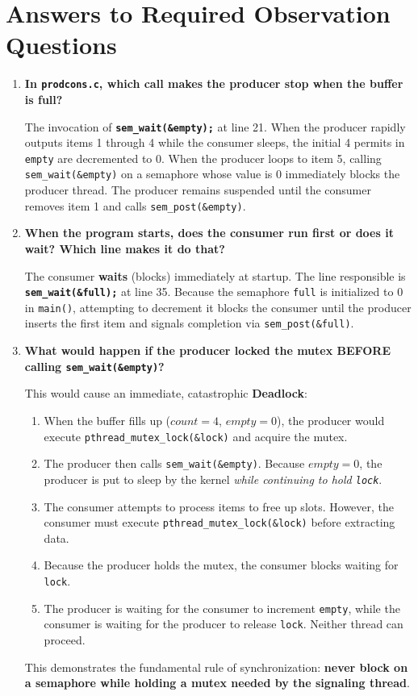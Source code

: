 \documentclass[12pt,a4paper]{report}
\numberwithin{equation}{chapter}
\numberwithin{figure}{chapter}
\numberwithin{table}{chapter}
\begin{document}
\section{Answers to Required Observation Questions}
\begin{enumerate}
    \item \textbf{In \texttt{prodcons.c}, which call makes the producer stop when the buffer is full?}
    
    The invocation of \textbf{\texttt{sem\_wait(\&empty);}} at line 21. 
    When the producer rapidly outputs items 1 through 4 while the consumer sleeps, the initial 4 permits in \texttt{empty} are decremented to 0. When the producer loops to item 5, calling \texttt{sem\_wait(\&empty)} on a semaphore whose value is 0 immediately blocks the producer thread. The producer remains suspended until the consumer removes item 1 and calls \texttt{sem\_post(\&empty)}.

    \item \textbf{When the program starts, does the consumer run first or does it wait? Which line makes it do that?}
    
    The consumer \textbf{waits} (blocks) immediately at startup.
    The line responsible is \textbf{\texttt{sem\_wait(\&full);}} at line 35. 
    Because the semaphore \texttt{full} is initialized to $0$ in \texttt{main()}, attempting to decrement it blocks the consumer until the producer inserts the first item and signals completion via \texttt{sem\_post(\&full)}.

    \item \textbf{What would happen if the producer locked the mutex BEFORE calling \texttt{sem\_wait(\&empty)}?}
    
    This would cause an immediate, catastrophic \textbf{Deadlock}:
    \begin{enumerate}
        \item When the buffer fills up ($count = 4$, $empty = 0$), the producer would execute \texttt{pthread\_mutex\_lock(\&lock)} and acquire the mutex.
        \item The producer then calls \texttt{sem\_wait(\&empty)}. Because $empty = 0$, the producer is put to sleep by the kernel \textit{while continuing to hold \texttt{lock}}.
        \item The consumer attempts to process items to free up slots. However, the consumer must execute \texttt{pthread\_mutex\_lock(\&lock)} before extracting data.
        \item Because the producer holds the mutex, the consumer blocks waiting for \texttt{lock}.
        \item The producer is waiting for the consumer to increment \texttt{empty}, while the consumer is waiting for the producer to release \texttt{lock}. Neither thread can proceed.
    \end{enumerate}
    This demonstrates the fundamental rule of synchronization: \textbf{never block on a semaphore while holding a mutex needed by the signaling thread}.
\end{enumerate}
\end{document}
